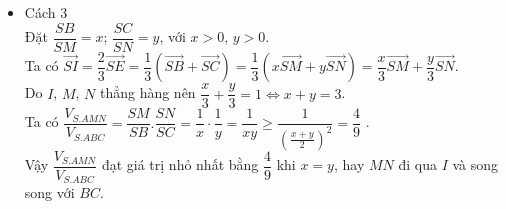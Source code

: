 \begin{ex}
{\begin{itemize}
{
			}
			Thật vậy, qua $I$ kẻ các đường thẳng lần lượt song song $SB,SC$ cắt $SC,SB$ tương ứng tại $D,L$.\\
			Ta có $\left.\begin{aligned}
				&\dfrac{SB}{IQ}=\dfrac{DB}{DI}=3\\ 
				&\dfrac{IQ}{SM}=\dfrac{NI}{NM}\\ 
			\end{aligned}\right\}\Rightarrow\dfrac{SB}{IQ}.\dfrac{IQ}{SM}=3.\dfrac{NI}{NM}\Leftrightarrow\dfrac{SB}{SM}=\dfrac{3NI}{NM}$, $(1)$.\\
			Lại có $\left.\begin{aligned}
				&\dfrac{SC}{IP}=\dfrac{LC}{LI}=3\\ 
				&\dfrac{IP}{SN}=\dfrac{MI}{MN}\\ 
			\end{aligned}\right\}\Rightarrow\dfrac{SC}{IP}.\dfrac{IP}{SN}=3.\dfrac{MI}{MN}\Leftrightarrow\dfrac{SC}{SN}=\dfrac{3MI}{MN}$, $(2)$.\\
			Từ $(1)$ và $(2)$ ta có $\dfrac{SB}{SM}+\dfrac{SC}{SN}=3\left(\dfrac{NI}{NM}+\dfrac{MI}{MN}\right)=3$.\\
			Đặt $x=\dfrac{SB}{SM};y=\dfrac{SC}{SN}$. Suy ra $x+y=3$.\\
			Ta có $\dfrac{V_{S.AMN}}{V_{S.ABC}}=\dfrac{SA}{SA}.\dfrac{SM}{SB}.\dfrac{SN}{SC}=\dfrac{1}{xy}\overset{AM-GM}{\mathop{\ge}}\dfrac{1}{\frac{\left(x+y\right)^2}{4}}=\dfrac{4}{9}$.\\
			Dấu ``$=$'' xảy ra khi và chỉ khi $x=y=\dfrac{3}{2}\Leftrightarrow MN\parallel BC$.
			\item Cách 3\\
			Đặt $\dfrac{SB}{SM}=x$; $\dfrac{SC}{SN}=y$, với $ x>0$, $ y>0$.\\
			Ta có $\overrightarrow{SI}=\dfrac{2}{3}\overrightarrow{SE}=\dfrac{1}{3}(\overrightarrow{SB}+\overrightarrow{SC})=\dfrac{1}{3}(x\overrightarrow{SM}+y\overrightarrow{SN})=\dfrac{x}{3}\overrightarrow{SM}+\dfrac{y}{3}\overrightarrow{SN}$.\\
			Do $I$, $M$, $N$ thẳng hàng nên $\dfrac{x}{3}+\dfrac{y}{3}=1\Leftrightarrow x+y=3$.\\
			Ta có $\dfrac{V_{S.AMN}}{V_{S.ABC}}=\dfrac{SM}{SB}.\dfrac{SN}{SC}=\dfrac{1}{x}\cdot\dfrac{1}{y}=\dfrac{1}{xy}\ge\dfrac{1}{(\frac{x+y}{2})^2}=\dfrac{4}{9}$ .\\
			Vậy $\dfrac{V_{S.AMN}}{V_{S.ABC}}$ đạt giá trị nhỏ nhất bằng $\dfrac{4}{9}$ khi $x=y$, hay $MN$ đi qua $I$ và song song với $BC$.
		\end{itemize}	
	}
\end{ex}
